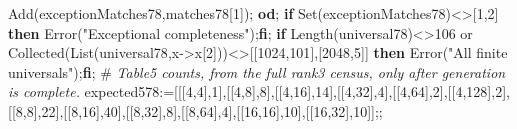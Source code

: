 \documentclass[
  10pt,
  letterpaper,
]{article}
\newenvironment{Shaded}{}{}
\newcommand{\BuiltInTok}[1]{\textcolor[rgb]{0.00,0.50,0.00}{#1}}
\newcommand{\CommentTok}[1]{\textcolor[rgb]{0.38,0.63,0.69}{\textit{#1}}}
\newcommand{\ConstantTok}[1]{\textcolor[rgb]{0.53,0.00,0.00}{#1}}
\newcommand{\ControlFlowTok}[1]{\textcolor[rgb]{0.00,0.44,0.13}{\textbf{#1}}}
\newcommand{\FloatTok}[1]{\textcolor[rgb]{0.25,0.63,0.44}{#1}}
\newcommand{\NormalTok}[1]{#1}
\newcommand{\OperatorTok}[1]{\textcolor[rgb]{0.40,0.40,0.40}{#1}}
\newcommand{\StringTok}[1]{\textcolor[rgb]{0.25,0.44,0.63}{#1}}
\newcommand{\VariableTok}[1]{\textcolor[rgb]{0.10,0.09,0.49}{#1}}
\begin{document}
\begin{Shaded}
\begin{Highlighting}[]
 \BuiltInTok{Add}\NormalTok{(}\VariableTok{exceptionMatches78}\OperatorTok{,}\VariableTok{matches78}\NormalTok{[}\FloatTok{1}\NormalTok{])}\OperatorTok{;}
\ControlFlowTok{od}\OperatorTok{;}
\ControlFlowTok{if} \BuiltInTok{Set}\NormalTok{(}\VariableTok{exceptionMatches78}\NormalTok{)}\OperatorTok{\textless{}\textgreater{}}\NormalTok{[}\FloatTok{1}\OperatorTok{,}\FloatTok{2}\NormalTok{] }\ControlFlowTok{then} \BuiltInTok{Error}\NormalTok{(}\StringTok{"Exceptional completeness"}\NormalTok{)}\OperatorTok{;}\ControlFlowTok{fi}\OperatorTok{;}
\ControlFlowTok{if} \BuiltInTok{Length}\NormalTok{(}\VariableTok{universal78}\NormalTok{)}\OperatorTok{\textless{}\textgreater{}}\FloatTok{106} \ConstantTok{or} \BuiltInTok{Collected}\NormalTok{(}\BuiltInTok{List}\NormalTok{(}\VariableTok{universal78}\OperatorTok{,}\VariableTok{x}\OperatorTok{{-}\textgreater{}}\VariableTok{x}\NormalTok{[}\FloatTok{2}\NormalTok{]))}\OperatorTok{\textless{}\textgreater{}}\NormalTok{[[}\FloatTok{1024}\OperatorTok{,}\FloatTok{101}\NormalTok{]}\OperatorTok{,}\NormalTok{[}\FloatTok{2048}\OperatorTok{,}\FloatTok{5}\NormalTok{]] }\ControlFlowTok{then} \BuiltInTok{Error}\NormalTok{(}\StringTok{"All finite universals"}\NormalTok{)}\OperatorTok{;}\ControlFlowTok{fi}\OperatorTok{;}
\NormalTok{\#}\CommentTok{ Table5 counts, from the full rank3 census, only after generation is complete.}
\VariableTok{expected578}\OperatorTok{:=}\NormalTok{[[[}\FloatTok{4}\OperatorTok{,}\FloatTok{4}\NormalTok{]}\OperatorTok{,}\FloatTok{1}\NormalTok{]}\OperatorTok{,}\NormalTok{[[}\FloatTok{4}\OperatorTok{,}\FloatTok{8}\NormalTok{]}\OperatorTok{,}\FloatTok{8}\NormalTok{]}\OperatorTok{,}\NormalTok{[[}\FloatTok{4}\OperatorTok{,}\FloatTok{16}\NormalTok{]}\OperatorTok{,}\FloatTok{14}\NormalTok{]}\OperatorTok{,}\NormalTok{[[}\FloatTok{4}\OperatorTok{,}\FloatTok{32}\NormalTok{]}\OperatorTok{,}\FloatTok{4}\NormalTok{]}\OperatorTok{,}\NormalTok{[[}\FloatTok{4}\OperatorTok{,}\FloatTok{64}\NormalTok{]}\OperatorTok{,}\FloatTok{2}\NormalTok{]}\OperatorTok{,}\NormalTok{[[}\FloatTok{4}\OperatorTok{,}\FloatTok{128}\NormalTok{]}\OperatorTok{,}\FloatTok{2}\NormalTok{]}\OperatorTok{,}\NormalTok{[[}\FloatTok{8}\OperatorTok{,}\FloatTok{8}\NormalTok{]}\OperatorTok{,}\FloatTok{22}\NormalTok{]}\OperatorTok{,}\NormalTok{[[}\FloatTok{8}\OperatorTok{,}\FloatTok{16}\NormalTok{]}\OperatorTok{,}\FloatTok{40}\NormalTok{]}\OperatorTok{,}\NormalTok{[[}\FloatTok{8}\OperatorTok{,}\FloatTok{32}\NormalTok{]}\OperatorTok{,}\FloatTok{8}\NormalTok{]}\OperatorTok{,}\NormalTok{[[}\FloatTok{8}\OperatorTok{,}\FloatTok{64}\NormalTok{]}\OperatorTok{,}\FloatTok{4}\NormalTok{]}\OperatorTok{,}\NormalTok{[[}\FloatTok{16}\OperatorTok{,}\FloatTok{16}\NormalTok{]}\OperatorTok{,}\FloatTok{10}\NormalTok{]}\OperatorTok{,}\NormalTok{[[}\FloatTok{16}\OperatorTok{,}\FloatTok{32}\NormalTok{]}\OperatorTok{,}\FloatTok{10}\NormalTok{]]}\OperatorTok{;;}

\end{Highlighting}
\end{Shaded}
\end{document}
